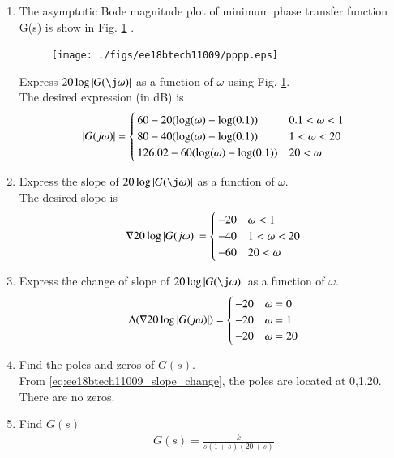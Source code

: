\begin{enumerate}[label=\thesubsection.\arabic*.,ref=\thesubsection.\theenumi]
\item 
The asymptotic Bode magnitude plot of  minimum phase transfer function
G(s) is show in Fig. \ref{fig:ee18btech11009_bode} .
\begin{figure}[htp]
	\centering
	\texttt{[image: ./figs/ee18btech11009/pppp.eps]}
	\caption{}
	\label{fig:ee18btech11009_bode}
\end{figure} 
%
Express $20\log\abs{G(\j\omega)}$ as a function of $\omega$ using Fig. \ref{fig:ee18btech11009_bode}.
\label{prob:ee18btech11009_bode}
\\
\solution The desired expression (in dB) is
{\footnotesize
\begin{align}
 \left\vert G(j\omega)\right\vert = 
 \begin{cases}
	60-20(\log(\omega)-\log(0.1)) &   0.1 < \omega < 1 \\
	80-40(\log(\omega)-\log(0.1)) &   1 < \omega < 20 \\
	126.02-60(\log(\omega)-\log(0.1)) &   20 < \omega   
 \end{cases}
\end{align}
}
\item Express the slope of $20\log\abs{G(\j\omega)}$ as a function of $\omega$. 
\\
\solution The desired slope is
\begin{align}
 \nabla20\log\left\vert G(j\omega)\right\vert = 
 \begin{cases}
	-20 &  \omega < 1 \\
	-40 & 1 < \omega < 20 \\
	-60 & 20 < \omega   
 \end{cases}
\end{align}

\item Express the change of slope of $20\log\abs{G(\j\omega)}$ as a function of $\omega$. 
\\
\solution 
\begin{align}
 \Delta(\nabla20\log\left\vert G(j\omega)\right\vert) = 
 \begin{cases}
    -20 &  \omega = 0 \\
	-20 &  \omega = 1 \\
	-20 &  \omega = 20
 \end{cases}
\label{eq:ee18btech11009_slope_change}
\end{align}
\item Find the poles and zeros of $G(s)$.
\\
\solution From \eqref{eq:ee18btech11009_slope_change}, the poles are located at 0,1,20. There are no zeros.
\item Find $G(s)$
\\
\solution 
\begin{align}
	G(s) = \frac{k}{s(1+s)(20+s)}
\end{align}


\end{enumerate}
